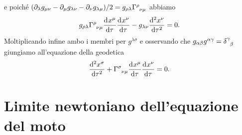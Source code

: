 e poiché
$(\partial_{\lambda} g_{\mu\nu} - \partial_{\mu}g_{\lambda\nu}
- \partial_{\nu}g_{\lambda\mu})/2 = g_{\rho\lambda}
\tensor{\Gamma}{^{\rho}_{\nu\mu}}$ abbiamo
\begin{equation}
  g_{\rho\lambda} \tensor{\Gamma}{^{\rho}_{\nu\mu}} \toder{x^{\mu}}{\tau}
  \toder{x^{\nu}}{\tau} - g_{\lambda\nu}\toder[2]{x^{\nu}}{\tau} = 0.
\end{equation}
Moltiplicando infine ambo i membri per $g^{\lambda\sigma}$ e osservando che
$g_{\alpha\beta}g^{\alpha\gamma} = \tensor{\delta}{^{\gamma}_{\beta}}$ giungiamo
all'equazione della geodetica
\begin{equation}
  \toder[2]{x^{\sigma}}{\tau} + \tensor{\Gamma}{^{\sigma}_{\nu\mu}}
  \toder{x^{\mu}}{\tau} \toder{x^{\nu}}{\tau} = 0.
\end{equation}

\section{Limite newtoniano dell'equazione del moto}
\label{sec:limite-newtoniano}

